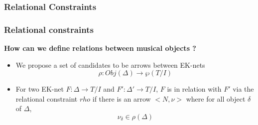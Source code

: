 \documentclass{beamer}
\begin{document}
\subsubsection{Relational Constraints}
\begin{frame}[fragile]
	\frametitle{Relational constraints}
	\textbf{How can we define relations between musical objects ?}
	\begin{itemize}
		\item We propose a set of candidates to be arrows between EK-nets $$\rho : Obj(\Delta) \rightarrow \wp(T/I)$$
		\item For two EK-net $F:\Delta\rightarrow T/I$ and $F':\Delta'\rightarrow T/I$, $F$ is in relation with $F'$ via the relational constraint $rho$ if there is an arrow $\big<N,\nu\big>$ where for all object $\delta$ of $\Delta$, $$\nu_\delta\in\rho(\Delta)$$
	\end{itemize}

	\begin{figure}
		\centering

		\label{fig:KAminor}
	\end{figure}

\end{frame}
\end{document}

